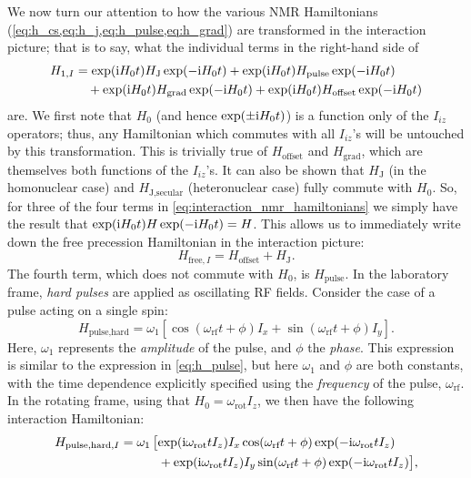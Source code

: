 We now turn our attention to how the various NMR Hamiltonians (\cref{eq:h_cs,eq:h_j,eq:h_pulse,eq:h_grad}) are transformed in the interaction picture; that is to say, what the individual terms in the right-hand side of
\begin{equation}
    \label{eq:interaction_nmr_hamiltonians}
    \begin{aligned}
        H_{1,I} &= \exp(\mathrm{i} H_0 t) H_\text{J} \exp(-\mathrm{i} H_0 t) + \exp(\mathrm{i} H_0 t) H_\text{pulse} \exp(-\mathrm{i} H_0 t) \\
                &\quad + \exp(\mathrm{i} H_0 t) H_\text{grad} \exp(-\mathrm{i} H_0 t) + \exp(\mathrm{i} H_0 t) H_\text{offset} \exp(-\mathrm{i} H_0 t)
    \end{aligned}
\end{equation}
are.
We first note that $H_0$ (and hence $\exp(\pm \mathrm{i} H_0t)$) is a function only of the $I_{iz}$ operators; thus, any Hamiltonian which commutes with all $I_{iz}$'s will be untouched by this transformation.
This is trivially true of $H_\text{offset}$ and $H_\text{grad}$, which are themselves both functions of the $I_{iz}$'s.
It can also be shown that $H_\text{J}$ (in the homonuclear case) and $H_\text{J,secular}$ (heteronuclear case) fully commute with $H_0$.
So, for three of the four terms in \cref{eq:interaction_nmr_hamiltonians} we simply have the result that $\exp(\mathrm{i} H_0t)H\exp(-\mathrm{i} H_0t) = H$.
This allows us to immediately write down the free precession Hamiltonian in the interaction picture:
\begin{equation}
    \label{eq:h_free_interaction}
    H_{\text{free},I} = H_\text{offset} + H_\text{J}.
\end{equation}
The fourth term, which does not commute with $H_0$, is $H_\text{pulse}$.
In the laboratory frame, \textit{hard pulses} are applied as oscillating RF fields.
Consider the case of a pulse acting on a single spin:
\begin{equation}
    \label{eq:hard_pulse}
    H_\text{pulse,hard} = \omega_1 [\cos(\omega_\text{rf}t + \phi) I_x + \sin(\omega_\text{rf}t + \phi) I_y].
\end{equation}
Here, $\omega_1$ represents the \textit{amplitude} of the pulse, and $\phi$ the \textit{phase}. This expression is similar to the expression in \cref{eq:h_pulse}, but here $\omega_1$ and $\phi$ are both constants, with the time dependence explicitly specified using the \textit{frequency} of the pulse, $\omega_\text{rf}$.
In the rotating frame, using that $H_0 = \omega_\text{rot}I_z$, we then have the following interaction Hamiltonian:
\begin{equation}
    \label{eq:hard_pulse_rotatingframe_intermediate}
    \begin{aligned}
        H_{\text{pulse,hard,}I} &= \omega_1 \,\big[\! \exp(\mathrm{i} \omega_\text{rot}t I_z) I_x \cos(\omega_\text{rf}t + \phi) \exp(-\mathrm{i} \omega_\text{rot}t I_z) \\
                                &\quad\quad\quad + \exp(\mathrm{i} \omega_\text{rot}t I_z) I_y \sin(\omega_\text{rf}t + \phi) \exp(-\mathrm{i} \omega_\text{rot}t I_z) \big],
    \end{aligned}
\end{equation}
